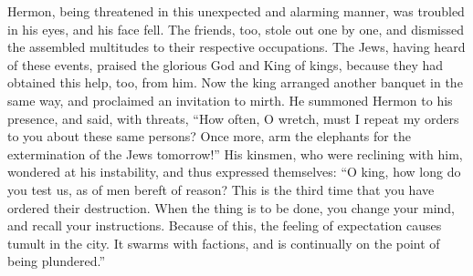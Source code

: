  Hermon, being threatened in this unexpected and alarming
manner, was troubled in his eyes, and his face fell.  The
friends, too, stole out one by one, and dismissed the assembled
multitudes to their respective occupations.  The Jews,
having heard of these events, praised the glorious God and King of
kings, because they had obtained this help, too, from him.
 Now the king arranged another banquet in the same way,
and proclaimed an invitation to mirth.  He summoned
Hermon to his presence, and said, with threats, ``How often, O wretch,
must I repeat my orders to you about these same persons? 
Once more, arm the elephants for the extermination of the Jews
tomorrow!''  His kinsmen, who were reclining with him,
wondered at his instability, and thus expressed themselves:
 ``O king, how long do you test us, as of men bereft of
reason? This is the third time that you have ordered their destruction.
When the thing is to be done, you change your mind, and recall your
instructions.  Because of this, the feeling of
expectation causes tumult in the city. It swarms with factions, and is
continually on the point of being plundered.''

